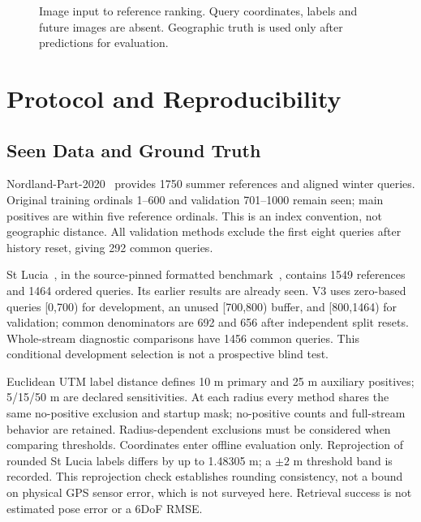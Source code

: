 \documentclass[conference]{IEEEtran}
\begin{document}
\begin{figure}[t]\centering
{}
\caption{Image input to reference ranking. Query coordinates, labels and future images are absent. Geographic truth is used only after predictions for evaluation.}\label{fig:pipeline}
\end{figure}

\section{Protocol and Reproducibility}
\subsection{Seen Data and Ground Truth}
Nordland-Part-2020~\cite{nordland} provides 1750 summer references and aligned winter queries. Original training ordinals 1--600 and validation 701--1000 remain seen; main positives are within five reference ordinals. This is an index convention, not geographic distance. All validation methods exclude the first eight queries after history reset, giving 292 common queries.

St Lucia~\cite{stlucia}, in the source-pinned formatted benchmark~\cite{benchmark}, contains 1549 references and 1464 ordered queries. Its earlier results are already seen. V3 uses zero-based queries [0,700) for development, an unused [700,800) buffer, and [800,1464) for validation; common denominators are 692 and 656 after independent split resets. Whole-stream diagnostic comparisons have 1456 common queries. This conditional development selection is not a prospective blind test.

Euclidean UTM label distance defines 10 m primary and 25 m auxiliary positives; 5/15/50 m are declared sensitivities. At each radius every method shares the same no-positive exclusion and startup mask; no-positive counts and full-stream behavior are retained. Radius-dependent exclusions must be considered when comparing thresholds. Coordinates enter offline evaluation only. Reprojection of rounded St Lucia labels differs by up to 1.48305 m; a $\pm2$ m threshold band is recorded. This reprojection check establishes rounding consistency, not a bound on physical GPS sensor error, which is not surveyed here. Retrieval success is not estimated pose error or a 6DoF RMSE.
\end{document}
